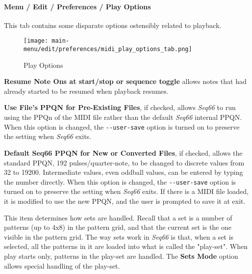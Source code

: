 \paragraph{Menu / Edit / Preferences / Play Options}
\label{paragraph:menu_edit_preferences_play_options}

   This tab contains some disparate options ostensibly related to playback.

\begin{figure}[H]
   \centering 
   \texttt{[image: main-menu/edit/preferences/midi\_play\_options\_tab.png]}
   \caption{Play Options}
   \label{fig:midi_play_options_tab}
\end{figure}

   \setcounter{ItemCounter}{0}      %

   \textbf{Resume Note Ons at start/stop or sequence toggle}
   allows notes that had already started
   to be resumed when playback resumes.

   \textbf{Use File's PPQN for Pre-Existing Files}, if checked, allows
   \textsl{Seq66} to run using the PPQn of the MIDI file rather than
   the default \textsl{Seq66} internal PPQN.
   When this option is changed, the \texttt{-{}-user-save} option is turned on
   to preserve the setting when \textsl{Seq66} exits.

   \textbf{Default Seq66 PPQN for New or Converted Files}, if checked, allows
   the standard PPQN, 192 pulses/quarter-note, to be changed to discrete values
   from 32 to 19200.  Intermediate values, even oddball values, can be entered
   by typing the number directly.
   When this option is changed, the \texttt{-{}-user-save} option is turned on
   to preserve the setting when \textsl{Seq66} exits.
   If there is a MIDI file loaded, it is modified to use the new PPQN, and the
   user is prompted to save it at exit.

   This item determines how sets are handled.
   Recall that a set is a number of patterns (up to 4x8) in the pattern grid,
   and that the current set is the one visible in the pattern grid.
   The way sets work in \textsl{Seq66} is that, when a set is selected,
   all the patterns in it are loaded into what is called
   the "play-set".
   When play starts only, patterns in the play-set are handled.
   The \textbf{Sets Mode} option allows special handling of the play-set.

